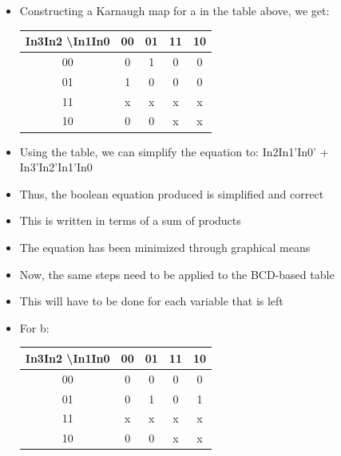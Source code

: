 \begin{itemize}
    \item Constructing a Karnaugh map for a in the table above, we get:

    \begin{center}
      \begin{tabular}[h!]{|c | c | c | c | c |}
        \hline
        In3In2 \textbackslash  In1In0 & 00 & 01 & 11 & 10\\
        \hline
        00 & 0 & 1 & 0 & 0\\
        \hline
        01 & 1 & 0 & 0 & 0\\
        \hline
        11 & x & x & x & x\\
        \hline
        10 & 0 & 0 & x & x\\
        \hline
      \end{tabular}
    \end{center}

  \item Using the table, we can simplify the equation to: In2In1'In0' + In3'In2'In1'In0

  \item Thus, the boolean equation produced is simplified and correct

  \item This is written in terms of a sum of products

  \item The equation has been minimized through graphical means

  \item Now, the same steps need to be applied to the BCD-based table

  \item This will have to be done for each variable that is left

    \newpage

  \item For b:

    \begin{center}
      \begin{tabular}[h!]{|c | c | c | c | c |}
        \hline
        In3In2 \textbackslash  In1In0 & 00 & 01 & 11 & 10\\
        \hline
        00 & 0 & 0 & 0 & 0\\
        \hline
        01 & 0 & 1 & 0 & 1\\
        \hline
        11 & x & x & x & x\\
        \hline
        10 & 0 & 0 & x & x\\
        \hline
      \end{tabular}
    \end{center}


\end{itemize}
